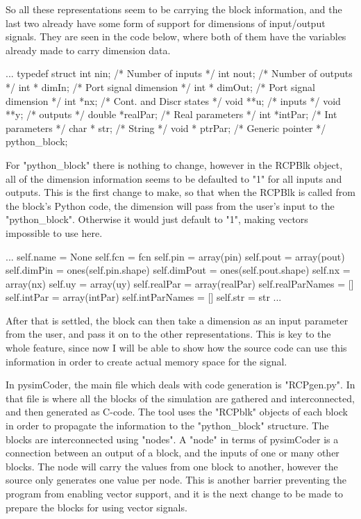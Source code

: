 \quad So all these representations seem to be carrying the block information, and the last two already have
some form of support for dimensions of input/output signals. They are seen in the code below, where both of
them have the variables already made to carry dimension data.

\begtt
...
typedef struct {
  int nin;             /* Number of inputs */
  int nout;            /* Number of outputs */
  int * dimIn;       /* Port signal dimension */
  int * dimOut;      /* Port signal dimension */
  int *nx;             /* Cont. and Discr states */
  void **u;            /* inputs */
  void **y;            /* outputs */
  double *realPar;     /* Real parameters */
  int *intPar;         /* Int parameters */
  char * str;          /* String */
  void * ptrPar;       /* Generic pointer */
}python_block;
\endtt

\quad For "python_block" there is nothing to change,
however in the RCPBlk object, all of the dimension information seems to be defaulted to "1" for all inputs
and outputs. This is the first change to make, so that when the RCPBlk is called from the block's Python
code, the dimension will pass from the user's input to the "python_block". Otherwise it would just default to
"1", making vectors impossible to use here.

\begtt
...
        self.name = None
        self.fcn = fcn
        self.pin = array(pin)
        self.pout = array(pout)
        self.dimPin = ones(self.pin.shape)
        self.dimPout = ones(self.pout.shape)
        self.nx = array(nx)
        self.uy = array(uy)
        self.realPar = array(realPar)
        self.realParNames = []
        self.intPar = array(intPar)
        self.intParNames = []
        self.str = str
...
\endtt

\quad After that is settled, the block can then take a dimension as an input parameter from the user, and pass
it on to the other representations. This is key to the whole feature, since now I will be able to show how
the source code can use this information in order to create actual memory space for the signal.

\quad In pysimCoder, the main file which deals with code generation is "RCPgen.py". In that file is where all
the blocks of the simulation are gathered and interconnected, and then generated as C-code. The tool uses the
"RCPblk" objects of each block in order to propagate the information to the "python_block" structure. The
blocks are interconnected using "nodes". A "node" in terms of pysimCoder is a connection between an output of
a block, and the inputs of one or many other blocks. The node will carry the values from one block to another,
however the source only generates one value per node. This is another barrier preventing the program from
enabling vector support, and it is the next change to be made to prepare the blocks for using vector signals.

